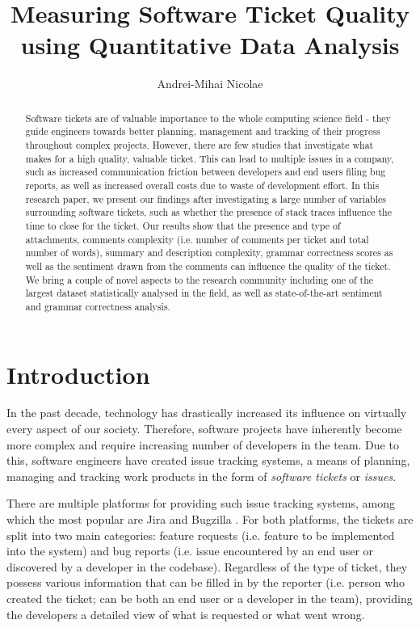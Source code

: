\documentclass{mpaper}
\begin{document}
\title{Measuring Software Ticket Quality using Quantitative Data Analysis}
\author{Andrei-Mihai Nicolae}

\maketitle

\begin{abstract}
Software tickets are of valuable importance to the whole computing science 
field - they guide engineers towards better planning, management 
and tracking of their progress throughout complex projects. However, there
are few studies that investigate what makes for a high quality,
valuable ticket. This can lead to multiple issues in a company, such as 
increased communication friction between developers and end users filing bug
reports, as well as increased overall costs due to waste of development effort. 
In this research paper, we present our findings after 
investigating a large number of variables surrounding software tickets, 
such as whether the presence of stack traces influence the time 
to close for the ticket. Our results show that the presence and type of attachments,
comments complexity (i.e. number of comments per ticket and total number of words), 
summary and description complexity, grammar correctness scores
as well as the sentiment drawn from the comments can influence the quality of the ticket.
We bring a couple of novel aspects to the research
community including one of the largest dataset statistically analysed in the field,
as well as state-of-the-art sentiment and grammar correctness analysis.
\end{abstract}

\section{Introduction}

In the past decade, technology has drastically increased its influence on 
virtually every aspect of our society. Therefore, software projects have 
inherently become more complex and require increasing number of developers in
the team. Due to this, software engineers have created issue tracking systems,
a means of planning, managing and tracking work products in the form of 
\emph{software tickets} or \emph{issues}.

There are multiple platforms for providing such issue tracking systems, among which
the most popular are Jira \cite{jira} and Bugzilla \cite{bugzilla}. For both platforms,
the tickets are split into two main categories: feature requests (i.e. feature to be 
implemented into the system) and bug reports (i.e. issue encountered by an end user or
discovered by a developer in the codebase). Regardless of the type of ticket, they possess
various information that can be filled in by the reporter (i.e. person who created the ticket; 
can be both an end user or a developer in the team), providing the developers
a detailed view of what is requested or what went wrong.
\end{document}

